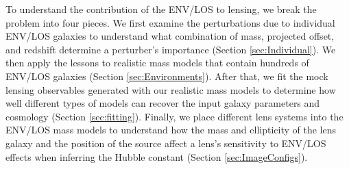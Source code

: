 \documentclass{emulateapj}
\begin{document}
To understand the contribution of the ENV/LOS to lensing, we break the problem into four pieces. We first examine the perturbations due to individual ENV/LOS galaxies to understand what combination of mass, projected offset, and redshift determine a perturber’s importance  (Section \ref{sec:Individual}). We then apply the lessons to realistic mass models that contain hundreds of ENV/LOS galaxies (Section \ref{sec:Environments}). After that, we fit the mock lensing observables generated with our realistic mass models to determine how well different types of models can recover the input galaxy parameters and cosmology (Section \ref{sec:fitting}). Finally, we place different lens systems into the ENV/LOS mass models to understand how the mass and ellipticity of the lens galaxy and the position of the source affect a lens's sensitivity to ENV/LOS effects when inferring the Hubble constant (Section \ref{sec:ImageConfigs}). 

\end{document}
